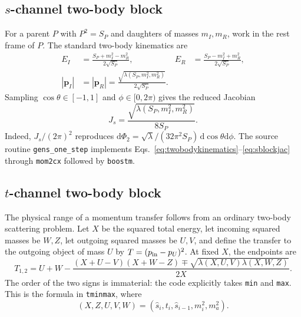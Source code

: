 \documentclass[11pt,a4paper]{article}
\newcommand{\dd}{\mathrm{d}}
\newcommand{\code}[1]{\texttt{#1}}
\newcommand{\lam}{\lambda}
\begin{document}
\subsection{$s$-channel two-body block}

For a parent $P$ with $P^2=S_P$ and daughters of masses $m_I,m_R$, work in the
rest frame of $P$.  The standard two-body kinematics are
\begin{align}
 E_I&=\frac{S_P+m_I^2-m_R^2}{2\sqrt{S_P}}, &
 E_R&=\frac{S_P-m_I^2+m_R^2}{2\sqrt{S_P}},\\
 |\boldsymbol p_I|&=|\boldsymbol p_R|=
 \frac{\sqrt{\lam(S_P,m_I^2,m_R^2)}}{2\sqrt{S_P}} .
 \label{eq:twobodykinematics}
\end{align}
Sampling $\cos\theta\in[-1,1]$ and $\phi\in[0,2\pi)$ gives the reduced
Jacobian
\begin{equation}
 J_s=\frac{\sqrt{\lam(S_P,m_I^2,m_R^2)}}{8S_P}.
 \label{eq:sblockjac}
\end{equation}
Indeed, $J_s/(2\pi)^2$ reproduces
$\dd\Phi_2=\sqrt{\lam}/(32\pi^2S_P)\,\dd\cos\theta\dd\phi$.
The source routine \code{gens\_one\_step} implements
Eqs.~\eqref{eq:twobodykinematics}--\eqref{eq:sblockjac} through
\code{mom2cx} followed by \code{boostm}.

\subsection{$t$-channel two-body block}

The physical range of a momentum transfer follows from an ordinary two-body
scattering problem.  Let $X$ be the squared total energy, let incoming squared
masses be $W,Z$, let outgoing squared masses be $U,V$, and define the transfer
to the outgoing object of mass $U$ by $T=(p_{\rm in}-p_U)^2$.  At fixed $X$,
the endpoints are
\begin{equation}
 T_{1,2}=U+W-
 \frac{(X+U-V)(X+W-Z)\mp
 \sqrt{\lam(X,U,V)\lam(X,W,Z)}}{2X}.
 \label{eq:tlimitsgeneric}
\end{equation}
The order of the two signs is immaterial: the code explicitly takes
\code{min} and \code{max}.  This is the formula in \code{tminmax}, where
\begin{equation}
 (X,Z,U,V,W)=
 (\hat s_i,t_i,\hat s_{i-1},m_i^2,m_a^2).
 \label{eq:tminmaxarguments}
\end{equation}
\end{document}
